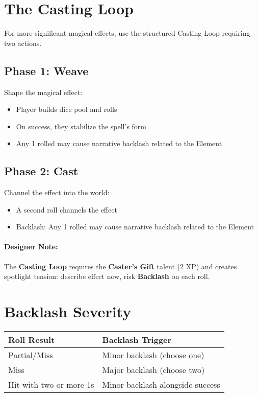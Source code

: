 \section{The Casting Loop} 

For more significant magical effects, use the structured Casting Loop requiring two actions.

\subsection*{Phase 1: Weave} 
Shape the magical effect:
\begin{itemize}
\item Player builds dice pool and rolls
\item On success, they stabilize the spell's form
\item Any 1 rolled may cause narrative backlash related to the Element
\end{itemize}

\subsection*{Phase 2: Cast} 
Channel the effect into the world:
\begin{itemize}
\item A second roll channels the effect
\item Backlash: Any 1 rolled may cause narrative backlash related to the Element
\end{itemize}

\paragraph{Designer Note:}
The \textbf{Casting Loop} requires the \textbf{Caster's Gift} talent (2 XP) and creates spotlight tension: describe effect now, risk \textbf{Backlash} on each roll.

\section{Backlash Severity} 

\begin{center}
\small
\begin{tabular}{ll}
\toprule
\textbf{Roll Result} & \textbf{Backlash Trigger} \\
\midrule
Partial/Miss & Minor backlash (choose one) \\
Miss & Major backlash (choose two) \\
Hit with two or more 1s & Minor backlash alongside success \\
\bottomrule
\end{tabular}
\end{center}

